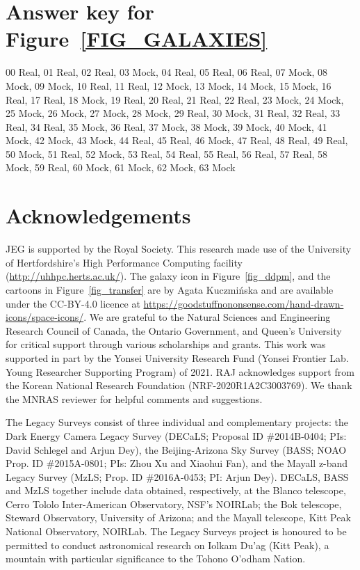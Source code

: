 \documentclass[fleqn,usenatbib]{mnras}
\begin{document}
\section*{Answer key for Figure~\ref{FIG_GALAXIES}}

00 Real, 01 Real, 02 Real, 03 Mock, 04 Real, 05 Real, 06 Real, 07 Mock, 08 Mock, 09 Mock, 10 Real, 11 Real, 12 Mock, 13 Mock, 14 Mock, 15 Mock, 16 Real, 17 Real, 18 Mock, 19 Real, 20 Real, 21 Real, 22 Real, 23 Mock, 24 Mock, 25 Mock, 26 Mock, 27 Mock, 28 Mock, 29 Real, 30 Mock, 31 Real, 32 Real, 33 Real, 34 Real, 35 Mock, 36 Real, 37 Mock, 38 Mock, 39 Mock, 40 Mock, 41 Mock, 42 Mock, 43 Mock, 44 Real, 45 Real, 46 Mock, 47 Real, 48 Real, 49 Real, 50 Mock, 51 Real, 52 Mock, 53 Real, 54 Real, 55 Real, 56 Real, 57 Real, 58 Mock, 59 Real, 60 Mock, 61 Mock, 62 Mock, 63 Mock

\section*{Acknowledgements}

JEG is supported by the Royal Society. This research made use of the University
of Hertfordshire's High Performance Computing facility
(\url{http://uhhpc.herts.ac.uk/}).  The galaxy icon in Figure~\ref{fig_ddpm},
and the cartoons in Figure~\ref{fig_transfer} are by Agata Kuczmi\'nska and are
available under the \mbox{CC-BY-4.0} licence at
\url{https://goodstuffnononsense.com/hand-drawn-icons/space-icons/}. We are
grateful to the Natural Sciences and Engineering Research Council of Canada,
the Ontario Government, and Queen’s University for critical support through
various scholarships and grants. This work was supported in part by the Yonsei
University Research Fund (Yonsei Frontier Lab. Young Researcher Supporting
Program) of 2021. RAJ acknowledges support from the Korean National Research
Foundation (NRF-2020R1A2C3003769). We thank the MNRAS reviewer for helpful
comments and suggestions.

The Legacy Surveys consist of three individual and complementary projects: the
Dark Energy Camera Legacy Survey (DECaLS; Proposal ID \#2014B-0404; PIs: David
Schlegel and Arjun Dey), the Beijing-Arizona Sky Survey (BASS; NOAO Prop. ID
\#2015A-0801; PIs: Zhou Xu and Xiaohui Fan), and the Mayall z-band Legacy Survey
(MzLS; Prop. ID \#2016A-0453; PI: Arjun Dey). DECaLS, BASS and MzLS together
include data obtained, respectively, at the Blanco telescope, Cerro Tololo
Inter-American Observatory, NSF’s NOIRLab; the Bok telescope, Steward
Observatory, University of Arizona; and the Mayall telescope, Kitt Peak
National Observatory, NOIRLab. The Legacy Surveys project is honoured to be
permitted to conduct astronomical research on Iolkam Du’ag (Kitt Peak), a
mountain with particular significance to the Tohono O’odham Nation.
\end{document}
